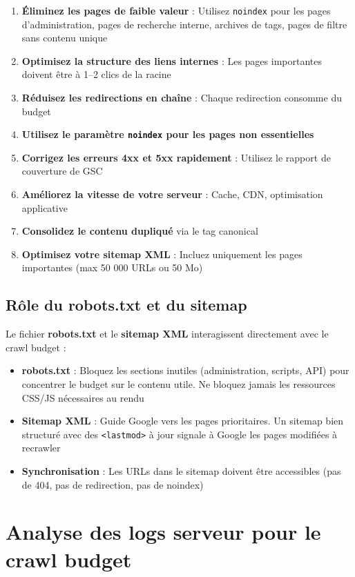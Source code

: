 \documentclass[12pt,a4paper,twoside]{report}
\newcommand{\keyword}[1]{\textbf{\textcolor{googleblue}{#1}}}
\begin{document}
\begin{enumerate}
    \item \textbf{Éliminez les pages de faible valeur} : Utilisez \texttt{noindex} pour les pages d'administration, pages de recherche interne, archives de tags, pages de filtre sans contenu unique
    \item \textbf{Optimisez la structure des liens internes} : Les pages importantes doivent être à 1--2 clics de la racine
    \item \textbf{Réduisez les redirections en chaîne} : Chaque redirection consomme du budget
    \item \textbf{Utilisez le paramètre \texttt{noindex} pour les pages non essentielles}
    \item \textbf{Corrigez les erreurs 4xx et 5xx rapidement} : Utilisez le rapport de couverture de GSC
    \item \textbf{Améliorez la vitesse de votre serveur} : Cache, CDN, optimisation applicative
    \item \textbf{Consolidez le contenu dupliqué} via le tag canonical
    \item \textbf{Optimisez votre sitemap XML} : Incluez uniquement les pages importantes (max 50 000 URLs ou 50 Mo)
\end{enumerate}

\subsection{Rôle du robots.txt et du sitemap}

Le fichier \keyword{robots.txt} et le \keyword{sitemap XML} interagissent directement avec le crawl budget :

\begin{itemize}
    \item \textbf{robots.txt} : Bloquez les sections inutiles (administration, scripts, API) pour concentrer le budget sur le contenu utile. Ne bloquez jamais les ressources CSS/JS nécessaires au rendu
    \item \textbf{Sitemap XML} : Guide Google vers les pages prioritaires. Un sitemap bien structuré avec des \texttt{<lastmod>} à jour signale à Google les pages modifiées à recrawler
    \item \textbf{Synchronisation} : Les URLs dans le sitemap doivent être accessibles (pas de 404, pas de redirection, pas de noindex)
\end{itemize}

\section{Analyse des logs serveur pour le crawl budget}
\end{document}

